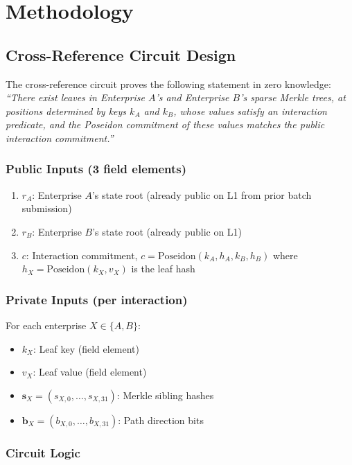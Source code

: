 
\section{Methodology}

\subsection{Cross-Reference Circuit Design}

The cross-reference circuit proves the following statement in zero knowledge:
\emph{``There exist leaves in Enterprise $A$'s and Enterprise $B$'s sparse
Merkle trees, at positions determined by keys $k_A$ and $k_B$, whose values
satisfy an interaction predicate, and the Poseidon commitment of these values
matches the public interaction commitment.''}

\subsubsection{Public Inputs (3 field elements)}
\begin{enumerate}
\item $r_A$: Enterprise $A$'s state root (already public on L1 from prior
  batch submission)
\item $r_B$: Enterprise $B$'s state root (already public on L1)
\item $c$: Interaction commitment, $c = \text{Poseidon}(k_A, h_A, k_B, h_B)$
  where $h_X = \text{Poseidon}(k_X, v_X)$ is the leaf hash
\end{enumerate}

\subsubsection{Private Inputs (per interaction)}
For each enterprise $X \in \{A, B\}$:
\begin{itemize}
\item $k_X$: Leaf key (field element)
\item $v_X$: Leaf value (field element)
\item $\mathbf{s}_X = (s_{X,0}, \ldots, s_{X,31})$: Merkle sibling hashes
\item $\mathbf{b}_X = (b_{X,0}, \ldots, b_{X,31})$: Path direction bits
\end{itemize}

\subsubsection{Circuit Logic}

